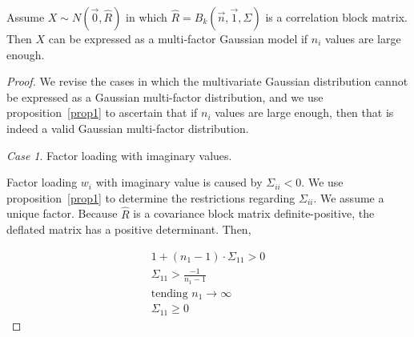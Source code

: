 \documentclass[11pt,fleqn]{book} %
\begin{document}
\begin{proposition}
	\label{prop:gmfamgb}
	Assume $X \sim N(\vec{0},\widehat{R})$ in which 
	$\widehat{R}=B_k(\vec{n},\vec{1},\Sigma)$ is a correlation block matrix. 
	Then $X$ can be expressed as a multi-factor Gaussian model if $n_i$ 
	values are large enough.
\end{proposition}
\begin{proof}
	We revise the cases in which the multivariate Gaussian distribution cannot
	be expressed as a Gaussian multi-factor distribution, and we use 
	proposition~\ref{prop1} to ascertain that if $n_i$ values are large enough, 
	then that is indeed a valid Gaussian multi-factor distribution.
	
	\emph{Case 1}. Factor loading with imaginary values.
	\begin{adjustwidth}{1cm}{0pt}
		Factor loading $w_i$ with imaginary value is caused by $\Sigma_{ii} < 0$. 
		We use proposition~\ref{prop1} to determine the restrictions regarding 
		$\Sigma_{ii}$. We assume a unique factor.
		Because $\widehat{R}$ is a covariance block matrix definite-positive, 
		the deflated matrix has a positive determinant. Then,
	\end{adjustwidth}
	\begin{displaymath}
		\begin{array}{l}
			1 + (n_1-1) \cdot \Sigma_{11} > 0
			\\
			\Sigma_{11} > \frac{-1}{n_1-1} 
			\\
			\text{tending } n_1 \to \infty
			\\
			\Sigma_{11} \ge 0
		\end{array}
	\end{displaymath}
	

\end{proof}
\end{document}
